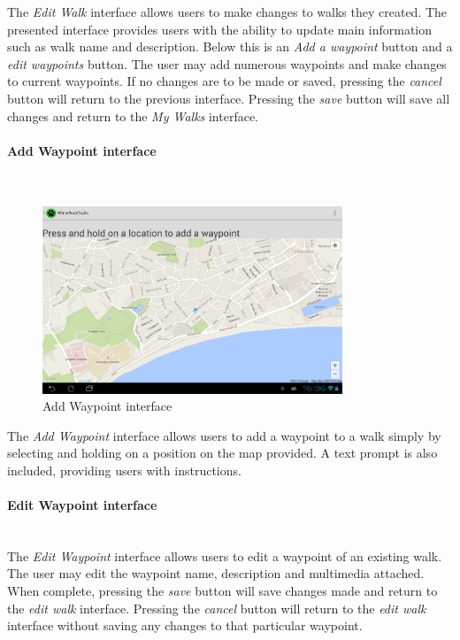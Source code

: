 \documentclass[11pt,a4paper]{report}
\begin{document}
The \emph{Edit Walk} interface allows users to make changes to walks they created. The presented interface provides users with the ability to update main information such as walk name and description. Below this is an \emph{Add a waypoint} button and a \emph{edit waypoints} button. The user may add numerous waypoints and make changes to current waypoints. If no changes are to be made or saved, pressing the \emph{cancel} button will return to the previous interface. Pressing the \emph{save} button will save all changes and return to the \emph{My Walks} interface.

\paragraph{Add Waypoint interface}\mbox{}\\
\begin{figure}[H]
    \centering
    \includegraphics[width=0.8\textwidth]{chris/add_waypoint}
    \caption{Add Waypoint interface}
    \label{fig:edit_waypoint}
\end{figure}

The \emph{Add Waypoint} interface allows users to add a waypoint to a walk simply by selecting and holding on a position on the map provided. A text prompt is also included, providing users with instructions.

\paragraph{Edit Waypoint interface}\mbox{}\\


The \emph{Edit Waypoint} interface allows users to edit a waypoint of an existing walk. The user may edit the waypoint name, description and multimedia attached. When complete, pressing the \emph{save} button will save changes made and return to the \emph{edit walk} interface. Pressing the \emph{cancel} button will return to the \emph{edit walk} interface without saving any changes to that particular waypoint.
\end{document}
